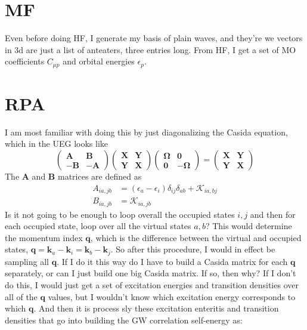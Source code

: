\section{MF}
Even before doing HF, I generate my basis of plain waves, and they're we vectors in 3d are just a list of anteaters, three entries long. 
From HF, I get a set of MO coefficients $C_{\mu p}$ and orbital energies $\epsilon_p$. 
\section{RPA}
I am most familiar with doing this by just diagonalizing the Casida equation, which in the UEG looks like
\begin{equation}
    \begin{pmatrix}
        \bm{A} & \bm{B} \\
        -\bm{B} & -\bm{A}
    \end{pmatrix}
    \begin{pmatrix}
        \bm{X} & \bm{Y} \\
        \bm{Y} & \bm{X}
    \end{pmatrix}
    \begin{pmatrix}
        \bm{\Omega} & \bm{0} \\
        \bm{0} & -\bm{\Omega}
    \end{pmatrix}
    = \begin{pmatrix}
        \bm{X} & \bm{Y} \\
        \bm{Y} & \bm{X}
    \end{pmatrix}
    \label{eqn:casida_eq}
\end{equation}
The $\bm{A}$ and $\bm{B}$ matrices are defined as
\begin{align}
    A_{i a, j b} &= \left(\epsilon_a-\epsilon_i\right) \delta_{i j} \delta_{a b}+\mathcal{K}_{i a, b j} \\
    B_{i a, j b} &= \mathcal{K}_{i a, j b}
\end{align}
Is it not going to be enough to loop overall the occupied states $i,j$ and then for each occupied state, loop over all the virtual states $a,b$? This would determine the momentum index $\bm{q}$, which is the difference between the virtual and occupied states, $\bm{q}=\bm{k}_a-\bm{k}_i=\bm{k}_b-\bm{k}_j$. So after this procedure, I would in effect be sampling all $\bm{q}$. If I do it this way do I have to build a Casida matrix for each $\bm{q}$ separately, or can I just build one big Casida matrix. If so, then why? If I don't do this, I would just get a set of excitation energies and transition densities over all of the $\bm{q}$ values, but I wouldn't know which excitation energy corresponds to which $\bm{q}$. And then it is process sly these excitation enteritis and transition densities that go into building the GW correlation self-energy as:
